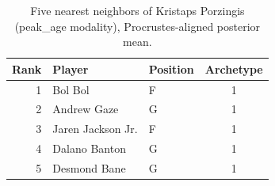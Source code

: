 \begin{table}[htbp]
  \centering\small
  \begin{tabular}{rllc}
    \toprule
    Rank & Player & Position & Archetype \\
    \midrule
    1 & Bol Bol & F & 1 \\
    2 & Andrew Gaze & G & 1 \\
    3 & Jaren Jackson Jr. & F & 1 \\
    4 & Dalano Banton & G & 1 \\
    5 & Desmond Bane & G & 1 \\
    \bottomrule
  \end{tabular}
  \caption{Five nearest neighbors of Kristaps Porzingis (peak_age modality), Procrustes-aligned posterior mean.}
  \label{tab:Kristaps_Porzingis_neighbors_peak_age}
\end{table}

